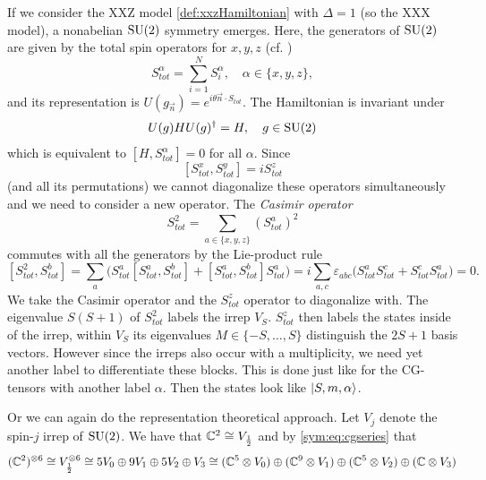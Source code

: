 \medskip
If we consider the XXZ model \eqref{def:xxzHamiltonian} with $\Delta=1$ (so the
XXX model), a nonabelian $\mathrm{SU}(2)$ symmetry emerges. Here, the generators of
$\mathrm{SU}(2)$ are given by the total spin operators for $x,y,z$ (cf. \cite[~§
3]{georgiLieAlgebrasParticle2018})
\[
  S_{tot}^\alpha 
  =
  \sum_{i = 1}^{N} S_i^\alpha, \quad \alpha \in \{x,y,z\},
\]
and its representation is  $U(g_{\vec{n}}) = e^{i\theta \vec{n} \cdot S_{tot}}$.
The Hamiltonian is invariant under
\[
  U(g) H U(g)^\dagger = H, \quad g \in \mathrm{SU}(2)
\]
which is equivalent to $[H, S_{tot}^\alpha] = 0$ for all $\alpha$. Since
\[
  [S_{tot}^x, S_{tot}^y ] = i S_{tot}^z 
\] (and all its permutations)
we cannot diagonalize these operators simultaneously and we need to consider a
new operator. The \emph{Casimir operator}
\[ 
  S_{tot}^2 = \sum_{a \in \{x,y,z\}}^{} (S_{tot}^{a})^2
\]
commutes with all the generators by the Lie-product rule
\cite[~Eq. 2.24]{georgiLieAlgebrasParticle2018}
\[
  [S_{tot}^2, S_{tot}^b]
  = 
  \sum_{a} \big( S^a_{tot}[S^a_{tot}, S^b_{tot}] + [S^a_{tot}, S^b_{tot}] S^a_{tot} \big)
  =
  i \sum_{a,c} \varepsilon_{abc} \big( S^a_{tot} S^c_{tot} + S^c_{tot} S^a_{tot} \big)
  = 0.
\]
We take the Casimir operator and the $S^z_{tot}$ operator to diagonalize with.
The eigenvalue $S(S+1)$ of $S^2_{tot}$ labels the irrep $V_S$.  $S^z_{tot}$ then labels the states inside of the
irrep, within $V_S$ its eigenvalues $M \in \{-S, \ldots, S\}$ distinguish the
$2S + 1$ basis vectors. However since the irreps also occur with a multiplicity,
we need yet another label to differentiate these blocks. This is done just like
for the CG-tensors with another label $\alpha$. Then the states look like
$\left| S,m,\alpha \right\rangle$.


Or we can again do the representation theoretical approach. Let $V_j$ denote the
spin-$j$ irrep of $\mathrm{SU}(2)$. We have that $\mathbb{C}^2 \cong V_{\frac{1}{2}}$ and by
\cref{sym:eq:cgseries} that
\[
  (\mathbb{C}^2)^{\otimes 6} 
  \cong 
  V_{\frac{1}{2}}^{\otimes 6} 
  \cong 
  5 V_0 \oplus 9V_1 \oplus 5V_2 \oplus V_3 
  \cong
  (\mathbb{C}^5 \otimes V_{0}) \oplus (\mathbb{C}^9 \otimes V_1) \oplus (\mathbb{C}^5 \otimes V_2) \oplus (\mathbb{C} \otimes V_3)
\]

